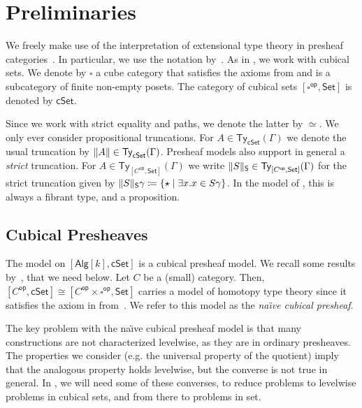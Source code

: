 \documentclass[10pt,a4paper]{article}
\theoremstyle{definition}
\theoremstyle{remark}
\newcommand{\Set}{\mathsf{Set}}
\newcommand{\cSet}{\mathsf{cSet}}
\newcommand{\Alg}{\mathsf{Alg}}
\DeclareMathOperator\op{\mathsf{op}}
\newcommand\Ty{\mathsf{Ty}}
\DeclarePairedDelimiter\set{\{}{\}}
\begin{document}
\section{Preliminaries}\label{sec:preliminaries}

We freely make use of the interpretation of extensional type theory in presheaf categories~\cite{hofmann,huber-phd-thesis}.
In particular, we use the notation by~\cite{huber-phd-thesis}.
As in \cite{draft}, we work with cubical sets.
We denote by \(\square\) a cube category that satisfies the axioms from \cite{survey} and is a subcategory of finite non-empty posets.
The category of cubical sets \([\square^{\op}, \Set]\) is denoted by \(\cSet\).

Since we work with strict equality and paths, we denote the latter by \(\simeq\).
We only ever consider propositional truncations.
For \(A \in \Ty_{\cSet}(\Gamma)\) we denote the usual truncation by \(\trunc{A} \in \Ty_{\cSet}(\Gamma)\).
Presheaf models also support in general a \emph{strict} truncation.
For \(A \in \Ty_{[C^{\op}, \Set]}(\Gamma)\) we write \(\trunc*{S} \in \Ty_{[C^{\op}, \Set]}(\Gamma)\) for the strict truncation given by \(\trunc*{S}\gamma \coloneqq \set{ \star \mid \exists x. x \in S\gamma }\).
In the model of \HoTT{}, this is always a fibrant type, and a proposition.


\subsection{Cubical Presheaves}

The model on \([\Alg[k], \cSet]\) is a cubical presheaf model.
We recall some results by~\cite{CRS21}, that we need below.
Let \(C\) be a (small) category.
Then, \([C^{\op}, \cSet] \cong [C^{\op} \times \square^{\op}, \Set]\) carries a model of homotopy type theory since it satisfies the axiom in from~\cite{survey}.
We refer to this model as the \emph{na{\"\i}ve cubical presheaf}.

The key problem with the na{\"\i}ve cubical presheaf model is that many constructions are not characterized levelwise, as they are in ordinary presheaves.
The properties we consider (e.g. the universal property of the quotient) imply that the analogous property holds levelwise, but the converse is not true in general.
In , we will need some of these converses, to reduce problems to levelwise problems in cubical sets, and from there to problems in set.
\end{document}
